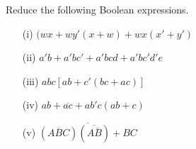 \eject

\begin{problem}\label{prob5.59}
Reduce the following Boolean expressions.
\begin{itemize}
\item[(i)] $(wx+wy'(x+w)+wx(x'+y')$

\item[(ii)] $a'b+a'bc'+a'bcd+a'bc'd'e$

\item[(iii)] $abc[ab+c'(bc+ac)]$

\item[(iv)] $ab+\overline{ac}+ab'c(ab+c)$

\item[(v)] $\overline{(A\overline{B}C)(\overline{A\overline{B}})+BC}$ 
\end{itemize}
\end{problem}

